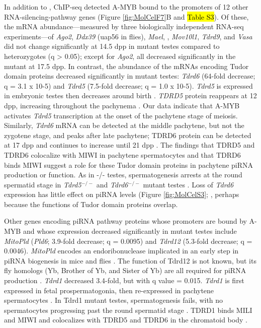     In addition to \miwi{}, ChIP-seq detected A-MYB bound to the promoters of 12 other RNA-silencing-pathway genes (Figure \ref{fig:MolCelF7}B and \hl{Table S3}). Of these, the mRNA abundance—measured by three biologically independent RNA-seq experiments—of \textit{Ago2}, \textit{Ddx39} (uap56 in flies), \textit{Mael}, \mili{}, \textit{Mov10l1}, \textit{Tdrd9}, and \textit{Vasa} did not change significantly at 14.5 dpp in \amyb{} mutant testes compared to heterozygotes (q > 0.05); except for \textit{Ago2}, all decreased significantly in the mutant at 17.5 dpp. In contrast, the abundance of the mRNAs encoding Tudor domain proteins decreased significantly in \amyb{} mutant testes: \textit{Tdrd6} (64-fold decrease; q = 3.1 x 10-5) and \textit{Tdrd5} (7.5-fold decrease; q = 1.0 x 10-5). \textit{Tdrd5} is expressed in embryonic testes then decreases around birth \citep{Yabuta2011}. \textit{TDRD5} protein reappears at 12 dpp, increasing throughout the pachynema \citep{Smith2004, Yabuta2011}. Our data indicate that A-MYB activates \textit{Tdrd5} transcription at the onset of the pachytene stage of meiosis. Similarly, \textit{Tdrd6} mRNA can be detected at the middle pachytene, but not the zygotene stage, and peaks after late pachytene; TDRD6 protein can be detected at 17 dpp and continues to increase until 21 dpp \citep{Vasileva2009}. The findings that TDRD5 and TDRD6 colocalize with MIWI in pachytene spermatocytes \citep{Hosokawa2007, Vasileva2009, Yabuta2011} and that TDRD6 binds MIWI \citep{Chen2009a, Vagin2009, Vasileva2009} suggest a role for these Tudor domain proteins in pachytene piRNA production or function. As in \miwi{}-/- testes, spermatogenesis arrests at the round spermatid stage in \textit{Tdrd5}$^{-/-}$ and \textit{Tdrd6}$^{-/-}$ mutant testes \citep{Vasileva2009, Yabuta2011}. Loss of \textit{Tdrd6} expression has little effect on piRNA levels (Figure \ref{fig:MolCelS3}; \citep{Vagin2009}, perhaps because the functions of Tudor domain proteins overlap.

    Other genes encoding piRNA pathway proteins whose promoters are bound by A-MYB and whose expression decreased significantly in \amyb{} mutant testes include \textit{MitoPld} (\textit{Pld6}; 3.9-fold decrease; q = 0.0095) and \textit{Tdrd12} (5.3-fold decrease; q = 0.0046). \textit{MitoPld} encodes an endoribonuclease implicated in an early step in piRNA biogenesis in mice and flies \citep{Houwing2007, Pane2007, Haase2010, Huang2011, Watanabe2011a, Ipsaro2012, Nishimasu2012}. The function of Tdrd12 is not known, but its fly homologs (Yb, Brother of Yb, and Sister of Yb) are all required for piRNA production \citep{Handler2011}. \textit{Tdrd1} decreased 3.4-fold, but with q value = 0.015. \textit{Tdrd1} is first expressed in fetal prospermatogonia, then re-expressed in pachytene spermatocytes \citep{Chuma2006a}. In Tdrd1 mutant testes, spermatogenesis fails, with no spermatocytes progressing past the round spermatid stage \citep{Chuma2006a}. TDRD1 binds MILI and MIWI \citep{Chen2009a, Kojima2009} and colocalizes with TDRD5 and TDRD6 in the chromatoid body \citep{Hosokawa2007}.

